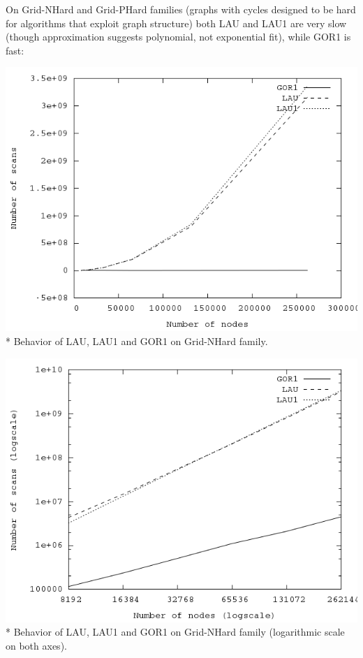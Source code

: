 \documentclass{article}
\theoremstyle{definition}
\begin{document}
\begin{multicols}{2}
On Grid-NHard and Grid-PHard families (graphs with cycles designed to be hard for algorithms that exploit graph structure)
both LAU and LAU1 are very slow (though approximation suggests polynomial, not exponential fit),
while GOR1 is fast:

\begin{center}
\includegraphics[width=\linewidth]{img/plot_grid_nhard.png}\\*
\footnotesize{Behavior of LAU, LAU1 and GOR1 on Grid-NHard family.}
\end{center}

\begin{center}
\includegraphics[width=\linewidth]{img/plot_grid_nhard_logscale.png}\\*
\footnotesize{Behavior of LAU, LAU1 and GOR1 on Grid-NHard family (logarithmic scale on both axes).}
\end{center}


\end{multicols}
\end{document}
